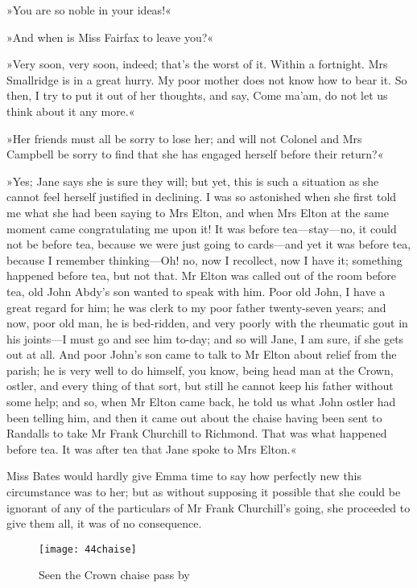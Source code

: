 »You are so noble in your ideas!«

»And when is Miss Fairfax to leave you?«

»Very soon, very soon, indeed; that's the worst of it. Within a fortnight. Mrs Smallridge is in a great hurry. My poor mother does not know how to bear it. So then, I try to put it out of her thoughts, and say, Come ma'am, do not let us think about it any more.«

»Her friends must all be sorry to lose her; and will not Colonel and Mrs Campbell be sorry to find that she has engaged herself before their return?«

»Yes; Jane says she is sure they will; but yet, this is such a situation as she cannot feel herself justified in declining. I was so astonished when she first told me what she had been saying to Mrs Elton, and when Mrs Elton at the same moment came congratulating me upon it! It was before tea—stay—no, it could not be before tea, because we were just going to cards—and yet it was before tea, because I remember thinking—Oh! no, now I recollect, now I have it; something happened before tea, but not that. Mr Elton was called out of the room before tea, old John Abdy's son wanted to speak with him. Poor old John, I have a great regard for him; he was clerk to my poor father twenty-seven years; and now, poor old man, he is bed-ridden, and very poorly with the rheumatic gout in his joints—I must go and see him to-day; and so will Jane, I am sure, if she gets out at all. And poor John's son came to talk to Mr Elton about relief from the parish; he is very well to do himself, you know, being head man at the Crown, ostler, and every thing of that sort, but still he cannot keep his father without some help; and so, when Mr Elton came back, he told us what John ostler had been telling him, and then it came out about the chaise having been sent to Randalls to take Mr Frank Churchill to Richmond. That was what happened before tea. It was after tea that Jane spoke to Mrs Elton.«

Miss Bates would hardly give Emma time to say how perfectly new this circumstance was to her; but as without supposing it possible that she could be ignorant of any of the particulars of Mr Frank Churchill's going, she proceeded to give them all, it was of no consequence.

\begin{figure}[tbph]
\centering
\texttt{[image: 44chaise]}
\caption{Seen the Crown chaise pass by}
\end{figure}

